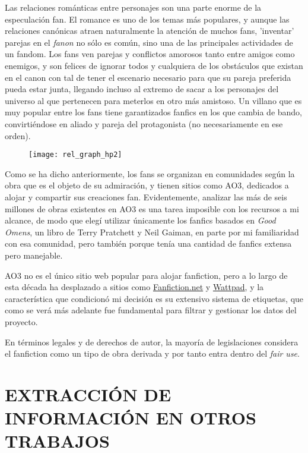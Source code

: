 \documentclass{pre-tfg}
\begin{document}
Las relaciones románticas entre personajes son una parte enorme de la especulación fan. El romance es uno de los temas más populares, y aunque las relaciones canónicas atraen naturalmente la atención de muchos fans, 'inventar' parejas en el \textit{fanon} no sólo es común, sino una de las principales actividades de un fandom. Los fans ven parejas y conflictos amorosos tanto entre amigos como enemigos, y son felices de ignorar todos y cualquiera de los obstáculos que existan en el canon con tal de tener el escenario necesario para que su pareja preferida pueda estar junta, llegando incluso al extremo de sacar a los personajes del universo al que pertenecen para meterlos en otro más amistoso. Un villano que es muy popular entre los fans tiene garantizados fanfics en los que cambia de bando, convirtiéndose en aliado y pareja del protagonista (no necesariamente en ese orden).

\begin{figure}
	\texttt{[image: rel\_graph\_hp2]}
	\label{fig:graph_hp}
	\centering
\end{figure}


Como se ha dicho anteriormente, los fans se organizan en comunidades según la obra que es el objeto de su admiración, y tienen sitios como AO3, dedicados a alojar y compartir sus creaciones fan. Evidentemente, analizar las más de seis millones de obras existentes en AO3 es una tarea imposible con los recursos a mi alcance, de modo que elegí utilizar únicamente los fanfics basados en \textit{Good Omens}, un libro de Terry Pratchett y Neil Gaiman, en parte por mi familiaridad con esa comunidad, pero también porque tenía una cantidad de fanfics extensa pero manejable.

AO3 no es el único sitio web popular para alojar fanfiction, pero a lo largo de esta década ha desplazado a sitios como \href{http://fanfiction.net}{Fanfiction.net} y \href{https://www.wattpad.com/}{Wattpad}, y la característica que condicionó mi decisión es su extensivo sistema de etiquetas, que como se verá más adelante fue fundamental para filtrar y gestionar los datos del proyecto.

En términos legales y de derechos de autor, la mayoría de legislaciones considera el fanfiction como un tipo de obra derivada \cite{woosh_1998} y por tanto entra dentro del \textit{fair use}.


\cleardoublepage
\section{EXTRACCIÓN DE INFORMACIÓN EN OTROS TRABAJOS}
\end{document}

